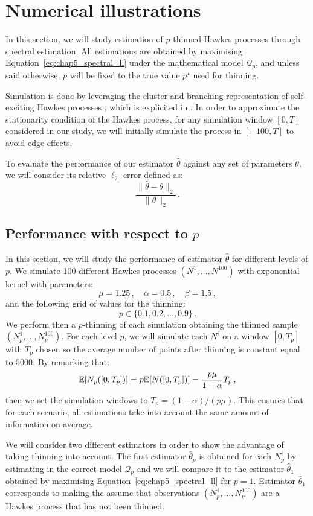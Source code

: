 \section{Numerical illustrations}
    In this section, we will study estimation of $p$-thinned Hawkes processes through spectral estimation.
    All estimations are obtained by maximising Equation~\eqref{eq:chap5_spectral_ll} under the mathematical model $\mathcal{Q}_p$,
    and unless said otherwise, $p$ will be fixed to the true value $p^\star$ used for thinning.

    Simulation is done by leveraging the cluster and branching representation of self-exciting Hawkes processes \parencite{Hawkes1974},
    which is explicited in \textcite[Algorithm 2]{Moller2005}.
    In order to approximate the stationarity condition of the Hawkes process,
    for any simulation window $[0,T]$ considered in our study, 
    we will initially simulate the process in $[-100, T]$ to avoid edge effects.

    To evaluate the performance of our estimator $\hat\theta$ against any set of parameters $\theta$,
    we will consider its relative $\ell_2$ error defined as:
    \[\frac{\|\hat \theta - \theta\|_2}{\|\theta\|_2}\,.\]

    \subsection{Performance with respect to $p$}

    In this section, we will study the performance of estimator $\hat\theta$ for different levels of $p$.
    We simulate 100 different Hawkes processes $(N^1,\ldots, N^{100})$ with exponential kernel with parameters:
    \[\mu = 1.25\,,\quad \alpha = 0.5\,,\quad \beta = 1.5\,,\]
    and the following grid of values for the thinning:
    \[p\in\{0.1, 0.2, \ldots, 0.9\}\,.\]
    We perform then a $p$-thinning of each simulation obtaining the thinned sample $(N_p^1, \ldots, N_p^{100})$.
    For each level $p$, 
    we will simulate each $N^i$ on a window $[0,T_p]$ with $T_p$ chosen so the average number of points after thinning is constant equal to $5000$.
    By remarking that:
    \[{\mathbb E}[N_p([0, T_p])] = p{\mathbb E}[N([0,T_p])] = \frac{ p \mu }{1-\alpha} T_p\,,\]
    then we set the simulation windows to $T_p = (1-\alpha) / (p \mu)$.
    This ensures that for each scenario, all estimations take into account the same amount of information on average.

    We will consider two different estimators in order to show the advantage of taking thinning into account.
    The first estimator $\hat \theta_p$ is obtained for each $N_p^i$ by estimating in the correct model $\mathcal{Q}_p$ 
    and we will compare it to the estimator $\hat \theta_1$ obtained by maximising Equation~\eqref{eq:chap5_spectral_ll}
    for $p=1$.
    Estimator $\hat \theta_1$ corresponds to making the assume that observations $(N_p^1, \ldots, N_p^{100})$
    are a Hawkes process that has not been thinned.

